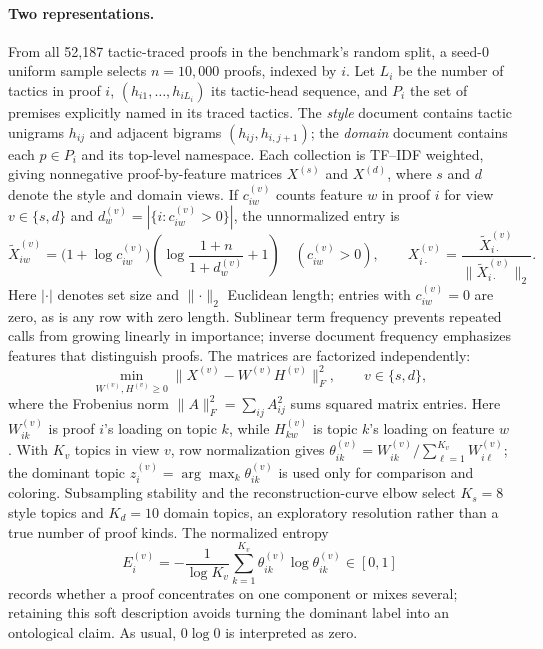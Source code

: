 \documentclass[11pt]{article}
\begin{document}
\paragraph{Two representations.}
From all 52,187 tactic-traced proofs in the benchmark's random split, a seed-0 uniform sample
selects $n=10{,}000$ proofs, indexed by $i$.  Let $L_i$ be the number of tactics in proof $i$,
$(h_{i1},\ldots,h_{iL_i})$ its tactic-head sequence, and $P_i$ the
set of premises explicitly named in its traced tactics.  The \emph{style} document contains
tactic unigrams $h_{ij}$ and adjacent bigrams $(h_{ij},h_{i,j+1})$; the \emph{domain} document
contains each $p\in P_i$ and its top-level namespace.  Each collection is TF--IDF weighted,
giving nonnegative proof-by-feature matrices $X^{(s)}$ and $X^{(d)}$, where $s$ and $d$
denote the style and domain views.  If $c^{(v)}_{iw}$ counts feature $w$ in proof $i$ for
view $v\in\{s,d\}$ and
$d^{(v)}_w=|\{i:c^{(v)}_{iw}>0\}|$, the unnormalized entry is
\[
 \widetilde X^{(v)}_{iw}
 =\bigl(1+\log c^{(v)}_{iw}\bigr)
   \left(\log\frac{1+n}{1+d^{(v)}_w}+1\right)
 \quad(c^{(v)}_{iw}>0),
 \qquad
 X^{(v)}_{i\cdot}=\frac{\widetilde X^{(v)}_{i\cdot}}
 {\lVert\widetilde X^{(v)}_{i\cdot}\rVert_2}.
\]
Here $|\cdot|$ denotes set size and $\lVert\cdot\rVert_2$ Euclidean length; entries with
$c^{(v)}_{iw}=0$ are zero, as is any row with zero length.
Sublinear term frequency prevents repeated calls from growing linearly in importance; inverse
document frequency emphasizes features that distinguish proofs.  The matrices are factorized
independently:
\[
 \min_{W^{(v)},H^{(v)}\geq0}
 \bigl\lVert X^{(v)}-W^{(v)}H^{(v)}\bigr\rVert_F^2,
 \qquad v\in\{s,d\},
\]
where the Frobenius norm $\lVert A\rVert_F^2=\sum_{ij}A_{ij}^2$ sums squared matrix entries.
Here $W^{(v)}_{ik}$ is proof $i$'s loading on topic $k$, while $H^{(v)}_{kw}$ is topic $k$'s
loading on feature $w$.  With $K_v$ topics in view $v$, row normalization gives
$\theta^{(v)}_{ik}=W^{(v)}_{ik}/\sum_{\ell=1}^{K_v}W^{(v)}_{i\ell}$; the dominant topic
$z_i^{(v)}=\arg\max_k\theta^{(v)}_{ik}$ is used only for comparison and coloring.  Subsampling
stability and the reconstruction-curve elbow select $K_s=8$ style topics and $K_d=10$ domain
topics, an exploratory resolution rather than a true number of proof kinds.  The normalized entropy
\[
 E_i^{(v)}=-\frac{1}{\log K_v}\sum_{k=1}^{K_v}
 \theta^{(v)}_{ik}\log\theta^{(v)}_{ik}\in[0,1]
\]
records whether a proof concentrates on one component or mixes several; retaining this soft
description avoids turning the dominant label into an ontological claim.  As usual,
$0\log0$ is interpreted as zero.
\end{document}
